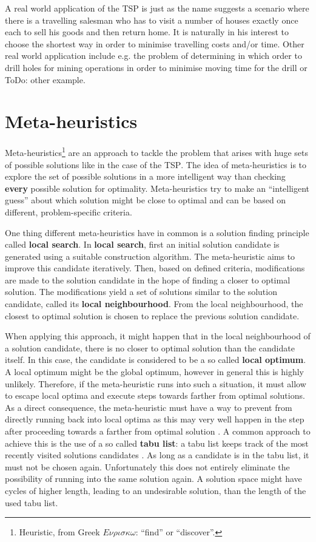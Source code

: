 A real world application of the \textsc{TSP} is just as the name suggests a scenario where there is a travelling salesman who has to visit a number of houses exactly once each to sell his goods and then return home. It is naturally in his interest to choose the shortest way in order to minimise travelling costs and/or time. Other real world application include e.g. the problem of determining in which order to drill holes for mining operations in order to minimise moving time for the drill or ToDo: other example.

\section{Meta-heuristics}
\label{chp:meta_heuristics}
Meta-heuristics\footnote{Heuristic, from Greek $E\nu\rho\iota\sigma\kappa\omega$: \enquote{find} or \enquote{discover}.} are an approach to tackle the problem that arises with huge sets of possible solutions like in the case of the \textsc{TSP}. The idea of meta-heuristics is to explore the set of possible solutions in a more intelligent way than checking \textbf{every} possible solution for optimality. Meta-heuristics try to make an \enquote{intelligent guess} about which solution might be close to optimal and can be based on different, problem-specific criteria.

One thing different meta-heuristics have in common is a solution finding principle called \textbf{local search}. In \textbf{local search}, first an initial solution candidate is generated using a suitable construction algorithm. The meta-heuristic aims to improve this candidate iteratively. Then, based on defined criteria, modifications are made to the solution candidate in the hope of finding a closer to optimal solution. The modifications yield a set of solutions similar to the solution candidate, called its \textbf{local neighbourhood}. From the local neighbourhood, the closest to optimal solution is chosen to replace the previous solution candidate.

When applying this approach, it might happen that in the local neighbourhood of a solution candidate, there is no closer to optimal solution than the candidate itself. In this case, the candidate is considered to be a so called \textbf{local optimum}. A local optimum might be the global optimum, however in general this is highly unlikely. Therefore, if the meta-heuristic runs into such a situation, it must allow to escape local optima and execute steps towards farther from optimal solutions. As a direct consequence, the meta-heuristic must have a way to prevent from directly running back into local optima as this may very well happen in the step after proceeding towards a farther from optimal solution \cite{}. A common approach to achieve this is the use of a so called \textbf{tabu list}: a tabu list keeps track of the most recently visited solutions candidates \cite{}. As long as a candidate is in the tabu list, it must not be chosen again. Unfortunately this does not entirely eliminate the possibility of running into the same solution again. A solution space might have cycles of higher length, leading to an undesirable solution, than the length of the used tabu list.

